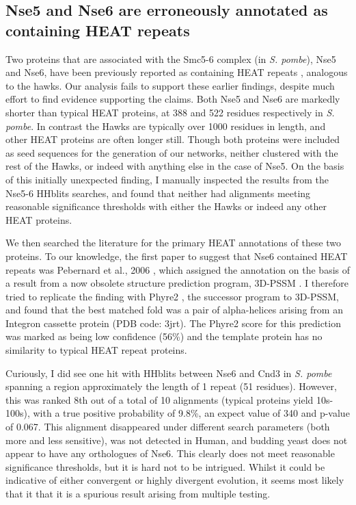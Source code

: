 \documentclass[a4paper,11pt,twoside,openright]{scrbook}
\begin{document}
\subsection{Nse5 and Nse6 are erroneously annotated as containing HEAT repeats}
Two proteins that are associated with the Smc5-6 complex (in \textit{S. pombe}), Nse5 and Nse6, have been previously reported as containing HEAT repeats \cite{Stephan2011,Palecek2015,Alt2017}, analogous to the hawks. Our analysis fails to support these earlier findings, despite much effort to find evidence supporting the claims. Both Nse5 and Nse6 are markedly shorter than typical HEAT proteins, at 388 and 522 residues respectively in \textit{S. pombe}. In contrast the Hawks are typically over 1000 residues in length, and other HEAT proteins are often longer still. Though both proteins were included as seed sequences for the generation of our networks, neither clustered with the rest of the Hawks, or indeed with anything else in the case of Nse5. On the basis of this initially unexpected finding, I manually inspected the results from the Nse5-6 HHblits searches, and found that neither had alignments meeting reasonable significance thresholds with either the Hawks or indeed any other HEAT proteins.

We then searched the literature for the primary HEAT annotations of these two proteins. To our knowledge, the first paper to suggest that Nse6 contained HEAT repeats was Pebernard et al., 2006 \cite{Pebernard2006}, which assigned the annotation on the basis of a result from a now obsolete structure prediction program, 3D-PSSM \cite{Kelley2000}. I therefore tried to replicate the finding with Phyre2 \cite{Kelley2015}, the successor program to 3D-PSSM, and found that the best matched fold was a pair of alpha-helices arising from an Integron cassette protein (PDB code: 3jrt). The Phyre2 score for this prediction was marked as being low confidence (56\%) and the template protein has no similarity to typical HEAT repeat proteins.

Curiously, I did see one hit with HHblits between Nse6 and Cnd3 in \textit{S. pombe} spanning a region approximately the length of 1 repeat (51 residues). However, this was ranked 8th out of a total of 10 alignments (typical proteins yield 10s-100s), with a true positive probability of 9.8\%, an expect value of 340 and p-value of 0.067. This alignment disappeared under different search parameters (both more and less sensitive), was not detected in Human, and budding yeast does not appear to have any orthologues of Nse6. This clearly does not meet reasonable significance thresholds, but it is hard not to be intrigued. Whilst it could be indicative of either convergent or highly divergent evolution, it seems most likely that it that it is a spurious result arising from multiple testing.
\end{document}
